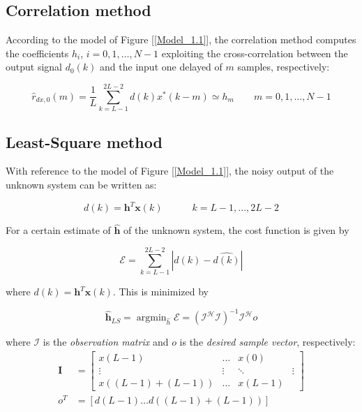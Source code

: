 \documentclass[a4paper, 12pt]{report}
\DeclareMathOperator*{\argmin}{argmin}
\begin{document}
\subsection*{Correlation method}
According to the model of Figure [\ref{Model_1.1}], the correlation method computes the coefficients $h_i$, $i=0,1,\dots,N-1$ exploiting the cross-correlation between the output signal $d_0(k)$ and the input one delayed of $m$ samples, respectively:

\begin{equation}
\hat{r}_{dx,0}(m) = \frac{1}{L} \sum_{k=L-1}^{2L-2}d(k)x^*(k-m) \simeq h_m \quad\quad m=0,1,\dots,N-1
\end{equation}
 
\subsection*{Least-Square method}
With reference to the model of Figure [\ref{Model_1.1}], the noisy output of the unknown system can be written as:

\begin{equation*}
d(k) = \mathbf{h}^T\mathbf{x}(k) \quad\quad\quad k=L-1,...,2L-2
\end{equation*}

For a certain estimate of \textbf{$\mathbf{\hat{h}}$} of the unknown system, the cost function is given by

\begin{equation}\label{cost}
\mathcal{E} = \sum_{k=L-1}^{2L-2}|d(k)-\hat{d(k)}|
\end{equation}

where $\hat{d(k)}=\mathbf{h}^T\mathbf{x}(k)$. This is minimized by 

\begin{equation}
\mathbf{\hat{h}}_{LS} = \argmin_{\hat{h}} \mathcal{E} = (\mathcal{I^HI})^{-1}\mathcal{I^H}o 
\end{equation}

where $\mathcal{I}$ is the \textit{observation matrix} and $o$ is the \textit{desired sample vector}, respectively:
\begin{equation*}
\begin{split}
\mathbf{I} &= \begin{bmatrix}
x(L-1) & \dots & x(0) \\
\vdots & \vdots & \ddots & \vdots \\
x((L-1)+(L-1)) &  \dots & x(L-1)
\end{bmatrix} \\
o^T &= [d(L-1) \dots d((L-1)+(L-1))]
\end{split}
\end{equation*}
\end{document}
